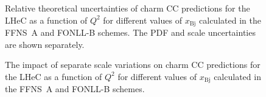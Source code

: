 \documentclass[pdftex,twocolumn,epjc3]{svjour3}          %
\newcommand{\xbj}{\ensuremath{x_{\text{Bj}}}\xspace}
\newcommand{\fonll} {{FONLL-B}\xspace}
\newcommand{\ffns} {{FFNS~A}\xspace}
\begin{document}
\begin{figure}
    \centering
    \caption{Relative theoretical uncertainties of charm CC
      predictions for the LHeC as a function of $Q^2$ for different
      values of \xbj calculated in the \ffns and \fonll schemes. The
      PDF and scale uncertainties are shown separately.}
    \label{fig:thpred-q2-unc}
\end{figure}

\begin{figure}
    \centering
    \caption{The impact of separate scale variations on charm CC
      predictions for the LHeC as a function of $Q^2$ for different
      values of \xbj calculated in the \ffns and \fonll schemes.}
    \label{fig:thpred-q2-varmu}
\end{figure}
\end{document}
